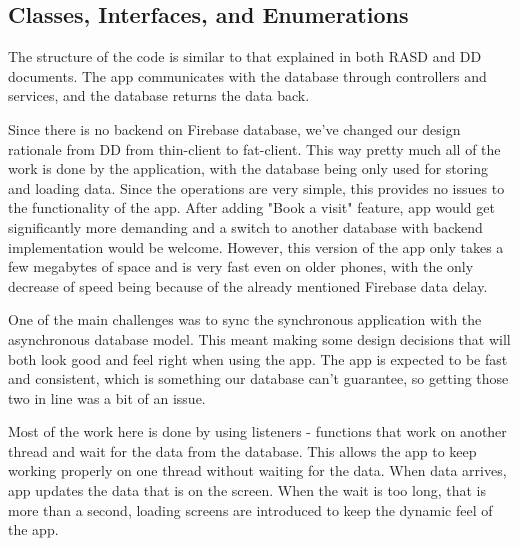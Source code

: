 \subsection{Classes, Interfaces, and Enumerations}
\hspace{\parindent} The structure of the code is similar to that explained in both RASD and DD documents. The app communicates with the database through controllers and services, and the database returns the data back. \newline

Since there is no backend on Firebase database, we've changed our design rationale from DD from thin-client to fat-client. This way pretty much all of the work is done by the application, with the database being only used for storing and loading data. Since the operations are very simple, this provides no issues to the functionality of the app. After adding "Book a visit" feature, app would get significantly more demanding and a switch to another database with backend implementation would be welcome. However, this version of the app only takes a few megabytes of space and is very fast even on older phones, with the only decrease of speed being because of the already mentioned Firebase data delay. \newline

One of the main challenges was to sync the synchronous application with the asynchronous database model. This meant making some design decisions that will both look good and feel right when using the app. The app is expected to be fast and consistent, which is something our database can't guarantee, so getting those two in line was a bit of an issue. \newline

Most of the work here is done by using listeners - functions that work on another thread and wait for the data from the database. This allows the app to keep working properly on one thread without waiting for the data. When data arrives, app updates the data that is on the screen. When the wait is too long, that is more than a second, loading screens are introduced to keep the dynamic feel of the app.\newline

